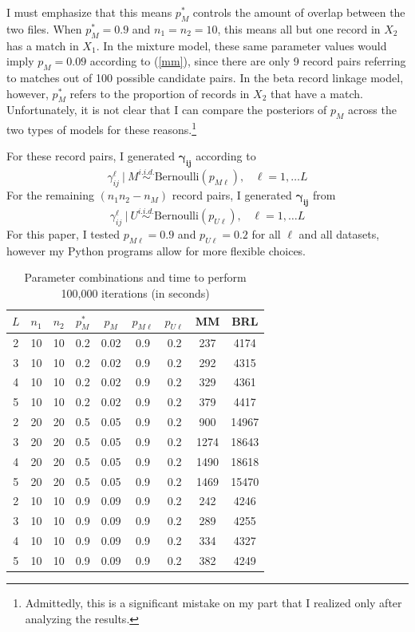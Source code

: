 \documentclass[11pt,reqno]{amsart}
\newcommand\gamij{\mathbf{\gamma_{ij}}}
\begin{document}
I must emphasize that this means $p_M^*$ controls the amount of overlap between the two files.  When $p_M^* = 0.9$ and $n_1=n_2 = 10$, this means all but one record in $X_2$ has a match in $X_1$.  In the mixture model, these same parameter values would imply $p_M = 0.09$ according to (\ref{mm}), since there are only 9 record pairs referring to matches out of 100 possible candidate pairs.  In the beta record linkage model, however, $p_M^*$ refers to the proportion of records in $X_2$ that have a match.  Unfortunately, it is not clear that I can compare the posteriors of $p_M$ across the two types of models for these reasons.\footnote{Admittedly, this is a significant mistake on my part that I realized only after analyzing the results.}

For these record pairs, I generated $\gamij$ according to
 $$\gamma_{ij}^{\ell} \ | \ M \overset{i.i.d.}{\sim}\text{Bernoulli}(p_{M\ell}), \hspace{10pt}\ell = 1,\dots L$$ 
For the remaining $(n_1n_2 - n_M)$ record pairs, I generated $\gamij$ from
  $$\gamma_{ij}^{\ell} \ | \ U \overset{i.i.d.}{\sim}\text{Bernoulli}(p_{U\ell}), \hspace{10pt}\ell = 1,\dots L$$ 
For this paper, I tested $p_{M\ell} = 0.9$ and $p_{U\ell}=0.2$ for all $\ell$ and all datasets, however my Python programs allow for more flexible choices.  

\begin{table}[h!]
\caption{Parameter combinations and time to perform 100,000 iterations (in seconds)}
\begin{center}
\begin{tabular}{ccccccc|cc}
\toprule
 $L$ &  $n_1$ &  $n_2$ &  $p_M^*$ &  $p_M$ & $p_{M\ell}$ &  $p_{U\ell}$ & MM & BRL \\
\midrule
 2 &  10 &  10 &  0.2 & 0.02 &  0.9 &  0.2 & 237 & 4174 \\
 3 &  10 &  10 &  0.2 & 0.02 & 0.9 &  0.2 & 292 & 4315 \\
 4 &  10 &  10 &  0.2 & 0.02 & 0.9 &  0.2 & 329 & 4361 \\ 
 5 &  10 &  10 &  0.2 & 0.02 & 0.9 &  0.2 & 379 & 4417 \\ 
 2 &  20 &  20 &  0.5 & 0.05 & 0.9 &  0.2 &  900 & 14967 \\ 
 3 &  20 &  20 &  0.5 & 0.05 & 0.9 &  0.2 & 1274 & 18643 \\ 
 4 &  20 &  20 &  0.5 & 0.05 & 0.9 &  0.2 & 1490 & 18618\\
 5 &  20 &  20 &  0.5 & 0.05 & 0.9 &  0.2 & 1469 & 15470 \\
 2 &  10 &  10 &  0.9 & 0.09 & 0.9 &  0.2 &  242 & 4246 \\
 3 &  10 &  10 &  0.9 & 0.09 & 0.9 &  0.2 & 289 & 4255 \\
 4 &  10 &  10 &  0.9 & 0.09 & 0.9 &  0.2 & 334 & 4327 \\
 5 &  10 &  10 &  0.9 & 0.09 & 0.9 &  0.2 & 382 & 4249 \\
\bottomrule
\end{tabular}
\end{center}
\label{params}
\end{table}%
\end{document}
